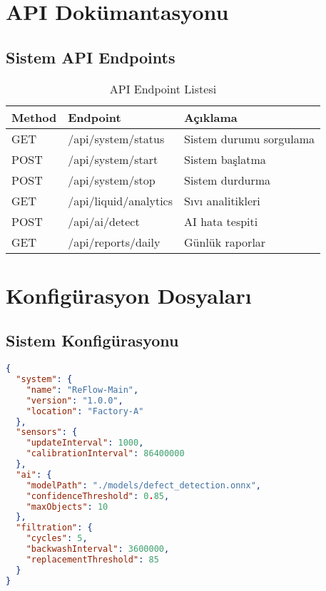 \documentclass[12pt,a4paper]{article}
\begin{document}
\section{API Dokümantasyonu}

\subsection{Sistem API Endpoints}

\begin{table}[H]
    \centering
    \caption{API Endpoint Listesi}
    \begin{tabular}{llp{6cm}}
        \toprule
        \textbf{Method} & \textbf{Endpoint} & \textbf{Açıklama} \\
        \midrule
        GET & /api/system/status & Sistem durumu sorgulama \\
        POST & /api/system/start & Sistem başlatma \\
        POST & /api/system/stop & Sistem durdurma \\
        GET & /api/liquid/analytics & Sıvı analitikleri \\
        POST & /api/ai/detect & AI hata tespiti \\
        GET & /api/reports/daily & Günlük raporlar \\
        \bottomrule
    \end{tabular}
    \label{tab:api_endpoints}
\end{table}

\section{Konfigürasyon Dosyaları}

\subsection{Sistem Konfigürasyonu}

\begin{lstlisting}[language=JSON, caption=config.json]
{
  "system": {
    "name": "ReFlow-Main",
    "version": "1.0.0",
    "location": "Factory-A"
  },
  "sensors": {
    "updateInterval": 1000,
    "calibrationInterval": 86400000
  },
  "ai": {
    "modelPath": "./models/defect_detection.onnx",
    "confidenceThreshold": 0.85,
    "maxObjects": 10
  },
  "filtration": {
    "cycles": 5,
    "backwashInterval": 3600000,
    "replacementThreshold": 85
  }
}
\end{lstlisting}
\end{document}
